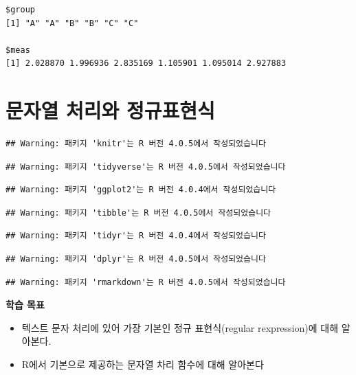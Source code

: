 \documentclass[
  11pt,
]{krantz}
\makeatletter
\providecommand{\tightlist}{%
  \setlength{\itemsep}{0pt}\setlength{\parskip}{0pt}}
\newenvironment{kframe}{%
\medskip{}
\setlength{\fboxsep}{.8em}
 \def\at@end@of@kframe{}%
 \ifinner\ifhmode%
  \def\at@end@of@kframe{\end{minipage}}%
  \begin{minipage}{\columnwidth}%
 \fi\fi%
 \def\FrameCommand##1{\hskip\@totalleftmargin \hskip-\fboxsep
 \colorbox{shadecolor}{##1}\hskip-\fboxsep
     \hskip-\linewidth \hskip-\@totalleftmargin \hskip\columnwidth}%
 \MakeFramed {\advance\hsize-\width
   \@totalleftmargin\z@ \linewidth\hsize
   \@setminipage}}%
 {\par\unskip\endMakeFramed%
 \at@end@of@kframe}
\newenvironment{rmdblock}[1]
  {
  \begin{itemize}
  \renewcommand{\labelitemi}{
    \raisebox{-.7\height}[0pt][0pt]{
      {\setkeys{Gin}{width=3em,keepaspectratio}\texttt{[image: images/\#1]}}
    }
  }
  \setlength{\fboxsep}{1em}
  \begin{kframe}
  \item
  }
  {
  \end{kframe}
  \end{itemize}
  }
\newenvironment{rmdimportant}
  {\begin{rmdblock}{important}}
  {\end{rmdblock}}
\makeatother
\begin{document}
\begin{verbatim}
$group
[1] "A" "A" "B" "B" "C" "C"

$meas
[1] 2.028870 1.996936 2.835169 1.105901 1.095014 2.927883
\end{verbatim}

\normalsize

\hypertarget{string-regexp}{%
\chapter{문자열 처리와 정규표현식}\label{string-regexp}}

\begin{verbatim}
## Warning: 패키지 'knitr'는 R 버전 4.0.5에서 작성되었습니다
\end{verbatim}

\begin{verbatim}
## Warning: 패키지 'tidyverse'는 R 버전 4.0.5에서 작성되었습니다
\end{verbatim}

\begin{verbatim}
## Warning: 패키지 'ggplot2'는 R 버전 4.0.4에서 작성되었습니다
\end{verbatim}

\begin{verbatim}
## Warning: 패키지 'tibble'는 R 버전 4.0.5에서 작성되었습니다
\end{verbatim}

\begin{verbatim}
## Warning: 패키지 'tidyr'는 R 버전 4.0.4에서 작성되었습니다
\end{verbatim}

\begin{verbatim}
## Warning: 패키지 'dplyr'는 R 버전 4.0.5에서 작성되었습니다
\end{verbatim}

\begin{verbatim}
## Warning: 패키지 'rmarkdown'는 R 버전 4.0.5에서 작성되었습니다
\end{verbatim}

\footnotesize

\begin{rmdimportant}
\textbf{학습 목표}

\begin{itemize}
\tightlist
\item
  텍스트 문자 처리에 있어 가장 기본인 정규 표현식(regular rexpression)에 대해 알아본다.
\item
  R에서 기본으로 제공하는 문자열 차리 함수에 대해 알아본다
\end{itemize}
\end{rmdimportant}
\end{document}
